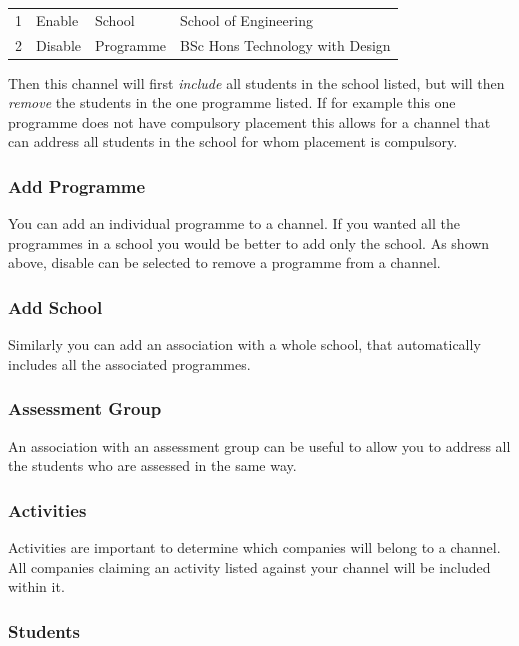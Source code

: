\documentclass[12 pt]{book}
\begin{document}
\begin{tabular}{llll}
1 & Enable & School & School of Engineering \\
2 & Disable & Programme & BSc Hons Technology with Design \\
\end{tabular}

Then this channel will first \emph{include} all students in the school listed,
but will then \emph{remove} the students in the one programme listed. If for
example this one programme does not have compulsory placement this allows for
a channel that can address all students in the school for whom placement is
compulsory.

\subsubsection{Add Programme}

You can add an individual programme to a channel. If you wanted all the
programmes in a school you would be better to add only the school. As shown
above, disable can be selected to remove a programme from a channel.

\subsubsection{Add School}

Similarly you can add an association with a whole school, that automatically
includes all the associated programmes.

\subsubsection{Assessment Group}

An association with an assessment group can be useful to allow you to address
all the students who are assessed in the same way.

\subsubsection{Activities}

Activities are important to determine which companies will belong to a channel.
All companies claiming an activity listed against your channel will be
included within it.

\subsubsection{Students}
\end{document}
